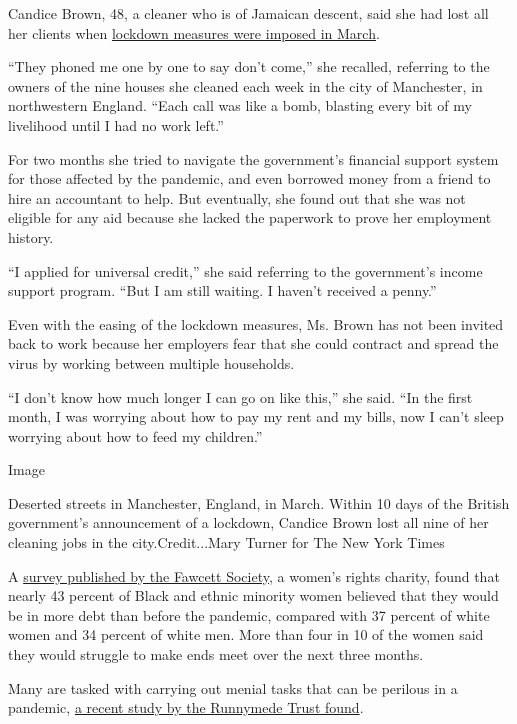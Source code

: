 Candice Brown, 48, a cleaner who is of Jamaican descent, said she had
lost all her clients when
\href{https://www.nytimes.com/2020/03/23/world/europe/coronavirus-uk-boris-johnson.html}{lockdown
measures were imposed in March}.

``They phoned me one by one to say don't come,'' she recalled, referring
to the owners of the nine houses she cleaned each week in the city of
Manchester, in northwestern England. ``Each call was like a bomb,
blasting every bit of my livelihood until I had no work left.''

For two months she tried to navigate the government's financial support
system for those affected by the pandemic, and even borrowed money from
a friend to hire an accountant to help. But eventually, she found out
that she was not eligible for any aid because she lacked the paperwork
to prove her employment history.

``I applied for universal credit,'' she said referring to the
government's income support program. ``But I am still waiting. I haven't
received a penny.''

Even with the easing of the lockdown measures, Ms. Brown has not been
invited back to work because her employers fear that she could contract
and spread the virus by working between multiple households.

``I don't know how much longer I can go on like this,'' she said. ``In
the first month, I was worrying about how to pay my rent and my bills,
now I can't sleep worrying about how to feed my children.''

Image

Deserted streets in Manchester, England, in March. Within 10 days of the
British government's announcement of a lockdown, Candice Brown lost all
nine of her cleaning jobs in the city.Credit...Mary Turner for The New
York Times

A
\href{https://www.fawcettsociety.org.uk/coronavirus-impact-on-bame-women}{survey
published by the Fawcett Society}, a women's rights charity, found that
nearly 43 percent of Black and ethnic minority women believed that they
would be in more debt than before the pandemic, compared with 37 percent
of white women and 34 percent of white men. More than four in 10 of the
women said they would struggle to make ends meet over the next three
months.

Many are tasked with carrying out menial tasks that can be perilous in a
pandemic,
\href{https://www.runnymedetrust.org/uploads/publications/pdfs/2020\%20reports/The\%20Colour\%20of\%20Money\%20Report.pdf}{a
recent study by the Runnymede Trust found}.

